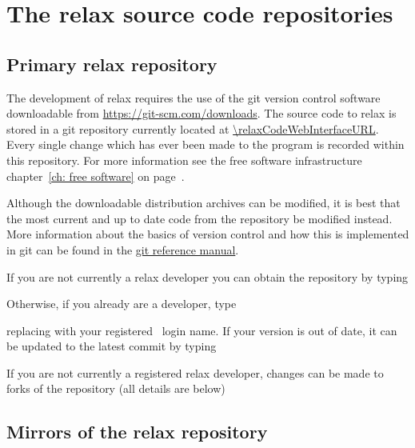 
\section{The relax source code repositories} \label{git repository}

\subsection{Primary relax repository}

The development of relax requires the use of the git version control software downloadable from \url{https://git-scm.com/downloads}.
The source code to relax is stored in a git repository currently located at \url{\relaxCodeWebInterfaceURL}.
Every single change which has ever been made to the program is recorded within this repository.
For more information see the free software infrastructure chapter~\ref{ch: free software} on page~\pageref{ch: free software}.

Although the downloadable distribution archives can be modified, it is best that the most current and up to date code from the repository be modified instead.
More information about the basics of version control and how this is implemented in git can be found in the \href{https://git-scm.com/docs}{git reference manual}.

If you are not currently a relax developer you can obtain the repository by typing


Otherwise, if you already are a developer, type


replacing \prompt{[username]} with your registered \relaxHome\ login name.
If your version is out of date, it can be updated to the latest commit by typing


If you are not currently a registered relax developer, changes can be made to forks of the repository (all details are below)



\subsection{Mirrors of the relax repository}

